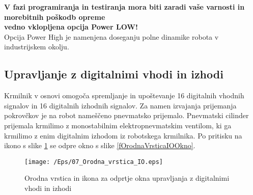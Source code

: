 \noindent %
\begin{mdframed}[backgroundcolor=red!80, shadow=true,roundcorner=8pt]
        \vspace{0.2cm}
        \large
\textcolor[rgb]{1.00,1.00,0.00}{\textbf{V fazi programiranja in testiranja mora biti zaradi vaše varnosti in morebitnih poškodb opreme}}\\ %
\textcolor[rgb]{1.00,1.00,0.00}{\LARGE \textbf{vedno vklopljena opcija Power LOW!}} \\ %
        \vspace{0.2cm}
\textcolor[rgb]{1.00,1.00,0.00}{\small Opcija Power High je namenjena doseganju polne dinamike robota v industrijskem okolju.} %
        \vspace{0.2cm}
\end{mdframed}
\normalsize







\vspace{0.0cm}
\subsection{Upravljanje z digitalnimi vhodi in izhodi}

Krmilnik v osnovi omogoča spremljanje in upoštevanje 16 digitalnih
vhodnih signalov in 16 digitalnih izhodnih signalov. Za namen
izvajanja prijemanja pokrovčkov je na robot nameščeno pnevmatsko
prijemalo. Pnevmatski cilinder prijemala krmilimo z monostabilnim
elektropnevmatskim ventilom, ki ga krmilimo z enim digitalnim
izhodom iz robotskega krmilnika. Po pritisku na ikono s slike
\ref{fOrodnaVrsticaIO} se odpre okno s slike
\ref{fOrodnaVrsticaIOOkno}.

\begin{figure}[h]
    \centering
    \texttt{[image: /Eps/07\_Orodna\_vrstica\_IO.eps]}
    \vspace{-0.9cm}
    \caption{Orodna vrstica in ikona za odprtje okna upravljanja z digitalnimi vhodi in izhodi}
    \label{fOrodnaVrsticaIO}
\end{figure}

